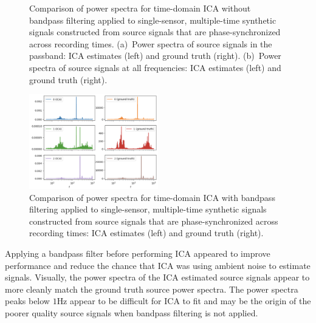 \documentclass[10pt]{article}
\begin{document}
\begin{figure}[ht]
    \vspace{0.1in}
    \begin{minipage}{0.85\linewidth}
    \caption{\label{fig:single-sensor-ica-time-domain-phase-synchronized-without-filter-source-power-spectra}
        Comparison of power spectra for time-domain ICA without bandpass filtering applied
        to single-sensor, multiple-time synthetic signals constructed from source signals
        that are phase-synchronized across recording times.
        (a)~Power spectra of source signals in the passband: ICA estimates (left) and
        ground truth (right).
        (b)~Power spectra of source signals at all frequencies: ICA estimates (left)
        and ground truth (right).
    }
    \end{minipage}
\end{figure}

\begin{figure}[ht]
    \centering
    \includegraphics[width=0.5\textwidth]{single-sensor-ica-time-domain-phase-synchronized-with-filter-source-power-spectra}
    \begin{minipage}{0.85\linewidth}
    \caption{\label{fig:single-sensor-ica-time-domain-phase-synchronized-with-filter-source-power-spectra}
        Comparison of power spectra for time-domain ICA with bandpass filtering applied to
        single-sensor, multiple-time synthetic signals constructed from source signals that
        are phase-synchronized across recording times: ICA estimates (left) and ground
        truth (right).
    }
    \end{minipage}
\end{figure}

Applying a bandpass filter before performing ICA appeared to improve performance and reduce
the chance that ICA was using ambient noise to estimate signals. Visually, the power
spectra of the ICA estimated source signals appear to more cleanly match the ground truth
source power spectra. The power spectra peaks below $1$Hz appear to be difficult for ICA
to fit and may be the origin of the poorer quality source signals when bandpass filtering
is not applied.
\end{document}
